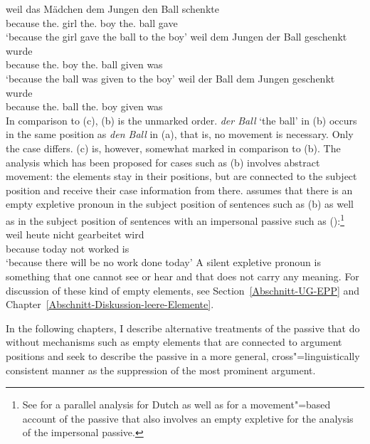 \eal
\label{ex-passive-German-no-movement}
\ex 
\gll weil das Mädchen dem Jungen den Ball schenkte\\
     because the.\nom{} girl the.\dat{} boy the.\acc{} ball gave\\
\glt `because the girl gave the ball to the boy'
\ex 
\gll weil dem Jungen der Ball geschenkt wurde\\
	 because the.\dat{} boy the.\nom{} ball given was\\
\glt `because the ball was given to the boy'
\ex 
\gll weil der Ball dem Jungen geschenkt wurde\\
     because the.\nom{} ball the.\dat{} boy given was\\
\zl
In comparison to (c), (b) is the unmarked order. \emph{der Ball} `the ball' in (b) occurs
in the same position as \emph{den Ball} in (a), that is, no movement is necessary. Only the case differs.
(c) is, however, somewhat marked in comparison to (b). The analysis which has been proposed for
cases such as (b) involves abstract movement: the elements stay in their positions, but are connected to
the subject position and receive their case information from there. \citet[]{Grewendorf93}
assumes that there is an empty expletive pronoun
in the subject position of sentences such as (b) as well as in the subject position of sentences with an
impersonal passive such as ():\footnote{
	See  for a parallel analysis for Dutch as well as 
	 for a movement"=based account of the passive that also involves an
        empty expletive for the analysis of the impersonal passive.
}
\ea
\gll weil heute nicht gearbeitet wird\\
	 because today not worked is\\
\glt `because there will be no work done today'
\z
A silent expletive pronoun is something that one cannot see or hear and that does not carry any meaning. For discussion of 
these kind of empty elements, see Section~\ref{Abschnitt-UG-EPP} and Chapter~\ref{Abschnitt-Diskussion-leere-Elemente}.

In the following chapters, I describe alternative treatments of the passive that do without mechanisms such as
empty elements that are connected to argument positions and seek to describe the passive in a more
general, cross"=linguistically consistent manner as the suppression of the most prominent argument.

